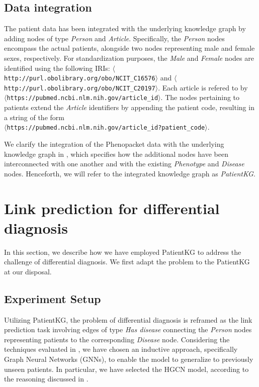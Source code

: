 \subsection{Data integration}
The patient data has been integrated with the underlying knowledge graph by adding nodes of type \emph{Person} and \emph{Article}. Specifically, the \emph{Person} nodes encompass the actual patients, alongside two nodes representing male and female sexes, respectively. For standardization purposes, the \emph{Male} and \emph{Female} nodes are identified using the following IRIs: \texttt{$\langle$http://purl.obolibrary.org/obo/NCIT\_C16576$\rangle$} and \texttt{$\langle$http://purl.obolibrary.org/obo/NCIT\_C20197$\rangle$}. Each article is refered to by \\ \texttt{$\langle$https://pubmed.ncbi.nlm.nih.gov/{article\_id}$\rangle$}. The nodes pertaining to patients extend the \emph{Article} identifiers by appending the patient code, resulting in a string of the form \\ \texttt{$\langle$https://pubmed.ncbi.nlm.nih.gov/{article\_id}?{patient\_code}$\rangle$}. 

We clarify the integration of the Phenopacket data with the underlying knowledge graph in , which specifies how the additional nodes have been interconnected with one another and with the existing \emph{Phenotype} and \emph{Disease} nodes. Henceforth, we will refer to the integrated knowledge graph as \emph{PatientKG}.


\section{Link prediction for differential diagnosis}\label{sec:linkPredictionDiffDiagnosis}
In this section, we describe how we have employed PatientKG to address the challenge of differential diagnosis. We first adapt the problem to the PatientKG at our disposal.

\subsection{Experiment Setup}
Utilizing PatientKG, the problem of differential diagnosis is reframed as the link prediction task involving edges of type \emph{Has disease} connecting the \emph{Person} nodes representing patients to the corresponding \emph{Disease} node. Considering the techniques evaluated in , we have chosen an inductive approach, specifically Graph Neural Networks (GNNs), to enable the model to generalize to previously unseen patients. In particular, we have selected the HGCN model, according to the reasoning discussed in .

